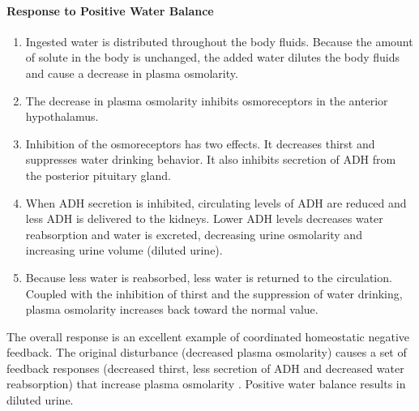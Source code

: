 \paragraph{Response to Positive Water Balance}

\begin{enumerate}
\item  Ingested water is distributed throughout the body fluids. Because the amount of solute in the body is unchanged, the added water dilutes the body fluids and cause a decrease in plasma osmolarity. 
\item The decrease in plasma osmolarity inhibits osmoreceptors in the anterior hypothalamus. 
\item Inhibition of the osmoreceptors has two effects. It decreases thirst and suppresses water drinking behavior. It also inhibits secretion of ADH from the posterior pituitary gland. 
\item When ADH secretion is inhibited, circulating levels of ADH are reduced and less ADH is delivered to the kidneys. Lower ADH levels decreases water reabsorption and water is excreted, decreasing urine osmolarity and increasing urine volume (diluted urine). 
\item Because less water is reabsorbed, less water is returned to the circulation. Coupled with the inhibition of thirst and the suppression of water drinking, plasma osmolarity increases back toward the normal value.
\end{enumerate}

The overall response is an excellent example of coordinated homeostatic negative feedback.  The original disturbance (decreased plasma osmolarity) causes a set of feedback responses (decreased thirst, less secretion of ADH and decreased water reabsorption) that increase plasma osmolarity \cite{hall_guyton_2020}. Positive water balance results in diluted urine.


